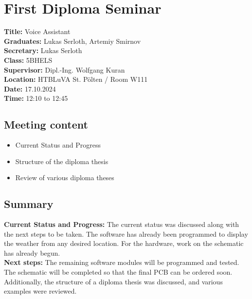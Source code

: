
\section{First Diploma Seminar}
\textbf{Title:} Voice Assistant\\

\noindent\textbf{Graduates:} Lukas Serloth, Artemiy Smirnov\\

\noindent\textbf{Secretary:} Lukas Serloth\\

\noindent\textbf{Class:} 5BHELS\\

\noindent\textbf{Supervisor:} Dipl.-Ing. Wolfgang Kuran\\

\noindent\textbf{Location:} HTBLuVA St. Pölten / Room W111\\

\noindent\textbf{Date:} 17.10.2024\\

\noindent\textbf{Time:} 12:10 to 12:45\\ 

\subsection{Meeting content}
\begin{itemize}
    \item Current Status and Progress
    \item Structure of the diploma thesis
    \item Review of various diploma theses
\end{itemize} 

\subsection{Summary}
\textbf{Current Status and Progress:} 
    The current status was discussed along with the next steps to be taken.
    The software has already been programmed to display the weather from any desired location.
    For the hardware, work on the schematic has already begun.\\

\noindent\textbf{Next steps:}
    The remaining software modules will be programmed and tested.
    The schematic will be completed so that the final PCB can be ordered soon.
    Additionally, the structure of a diploma thesis was discussed, and various examples were reviewed.

